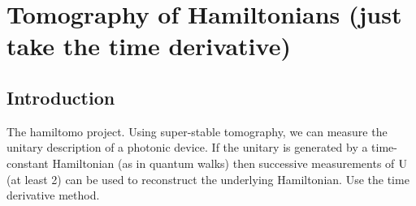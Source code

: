 \chapter{Tomography of Hamiltonians (just take the time derivative)}
\label{ch:Hamiltomo}

\section{Introduction}
\label{sec:HTIntro}
The hamiltomo project. Using super-stable tomography, we can measure the unitary
description of a photonic device. If the unitary is generated by a time-constant
Hamiltonian (as in quantum walks) then successive measurements of \(\mathrm{U}\)
(at least 2) can be used to reconstruct the underlying Hamiltonian. Use the time
derivative method.
